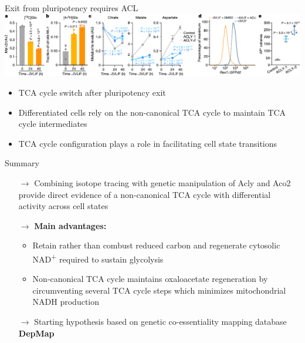 \documentclass[10pt, aspectratio=169]{beamer}
\begin{document}
\begin{frame}{Exit from pluripotency requires ACL}
\includegraphics[width=\textwidth]{figures/Arnold_2022_fig4.pdf}

\vspace{0.3cm}

\begin{itemize}
    \item TCA cycle switch after pluripotency exit\\[0.2cm]
    \item Differentiated cells rely on the non-canonical TCA cycle to maintain TCA cycle intermediates\\[0.2cm]
    \item TCA cycle configuration plays a role in facilitating cell state transitions
\end{itemize}

\end{frame}

\begin{frame}{Summary}
\begin{itemize}
    \item[$\rightarrow$] Combining isotope tracing with genetic manipulation of Acly and Aco2 provide direct evidence of a non-canonical TCA cycle with differential activity across cell states\\[0.3cm]
\pause    
    \item[$\rightarrow$] \textbf{Main advantages:}
\begin{itemize}
    \item Retain rather than combust reduced carbon and regenerate cytosolic NAD\textsuperscript{+} required to sustain glycolysis\\[0.2cm]
    \item Non-canonical TCA cycle maintains oxaloacetate regeneration by circumventing several TCA cycle steps which minimizes mitochondrial NADH production \\[0.3cm]
\end{itemize}
\pause
    \item[$\rightarrow$] Starting hypothesis based on genetic co-essentiality mapping database \textbf{DepMap}
\end{itemize}
\end{frame}
\end{document}
